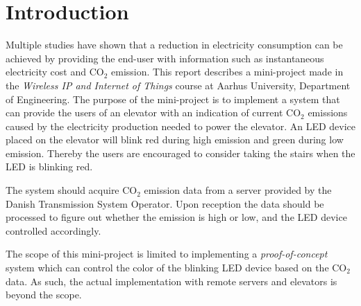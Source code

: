 \documentclass[Main]{subfiles}
\begin{document}
\section*{Introduction} %
\label{sec:introduction}
	Multiple studies have shown that a reduction in electricity consumption can be achieved by providing the end-user with information such as instantaneous electricity cost and CO$_2$ emission\cite{Tricascade:2009:Online}. 
	This report describes a mini-project made in the \emph{Wireless IP and Internet of Things} course at Aarhus University, Department of Engineering. 
	The purpose of the mini-project is to implement a system that can provide the users of an elevator with an indication of current CO$_2$ emissions caused by the electricity production needed to power the elevator. 
	An LED device placed on the elevator will blink red during high emission and green during low emission. 
	Thereby the users are encouraged to consider taking the stairs when the LED is blinking red. 

	The system should acquire CO$_2$ emission data from a server provided by the Danish Transmission System Operator. 
	Upon reception the data should be processed to figure out whether the emission is high or low, and the LED device controlled accordingly.

	The scope of this mini-project is limited to implementing a \emph{proof-of-concept} system which can control the color of the blinking LED device based on the CO$_2$ data.
	As such, the actual implementation with remote servers and elevators is beyond the scope.



\end{document}
